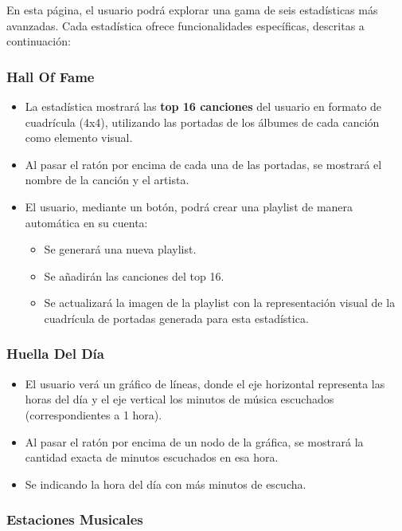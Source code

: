 En esta página, el usuario podrá explorar una gama de seis estadísticas más avanzadas. Cada estadística ofrece funcionalidades específicas, descritas a continuación:

\subsubsection*{Hall Of Fame}

\begin{itemize}
    \item La estadística mostrará las \textbf{top 16 canciones} del usuario en formato de cuadrícula (4x4), utilizando las portadas de los álbumes de cada canción como elemento visual.
    \item Al pasar el ratón por encima de cada una de las portadas, se mostrará el nombre de la canción y el artista.
    \item El usuario, mediante un botón, podrá crear una playlist de manera automática en su cuenta:
          \begin{itemize}
              \item Se generará una nueva playlist.
              \item Se añadirán las canciones del top 16.
              \item Se actualizará la imagen de la playlist con la representación visual de la cuadrícula de portadas generada para esta estadística.
          \end{itemize}
\end{itemize}

\subsubsection*{Huella Del Día}

\begin{itemize}
    \item El usuario verá un gráfico de líneas, donde el eje horizontal representa las horas del día y el eje vertical los minutos de música escuchados (correspondientes a 1 hora).
    \item Al pasar el ratón por encima de un nodo de la gráfica, se mostrará la cantidad exacta de minutos escuchados en esa hora.
    \item Se indicando la hora del día con más minutos de escucha.
\end{itemize}

\subsubsection*{Estaciones Musicales}

